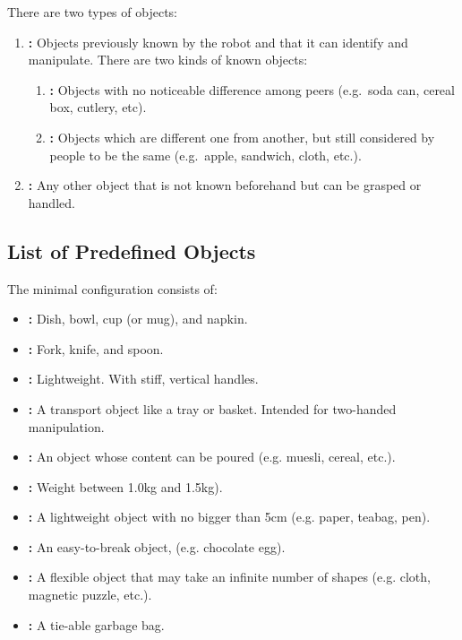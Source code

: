 There are two types of objects:

\begin{enumerate}
	\item \textbf{:} Objects previously known by the robot and that it can identify and manipulate.
	There are two kinds of known objects:
	\begin{enumerate}
		\item \textbf{:} Objects with no noticeable difference among peers (e.g.~soda can, cereal box, cutlery, etc).
		\item \textbf{:} Objects which are different one from another, but still considered by people to be the same (e.g.~apple, sandwich, cloth, etc.).
	\end{enumerate}

	\item \textbf{:} Any other object that is not known beforehand but can be grasped or handled.
\end{enumerate}

\subsection{List of Predefined Objects}
\label{rule:scenario_objects_list}
The minimal configuration consists of:
\begin{itemize}
	\item \textbf{:} Dish, bowl, cup (or mug), and napkin.
	\item \textbf{:} Fork, knife, and spoon.
	\item \textbf{:} Lightweight. With stiff, vertical handles.
	\item \textbf{:} A transport object like a tray or basket. Intended for two-handed manipulation.
	\item \textbf{:} An object whose content can be poured (e.g. muesli, cereal, etc.).
	\item \textbf{:} Weight between 1.0kg and 1.5kg).
	\item \textbf{:} A lightweight object with no bigger than 5cm (e.g. paper, teabag, pen).
	\item \textbf{:} An easy-to-break object, (e.g. chocolate egg).
	\item \textbf{:} A flexible object that may take an infinite number of shapes (e.g. cloth, magnetic puzzle, etc.).
	\item \textbf{:} A tie-able garbage bag.
\end{itemize}

